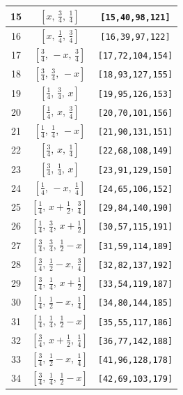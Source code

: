 \documentclass[fleqn,8pt]{jsarticle}
\begin{document}
\begin{longtable}{ccc}
15 & $\left[ x,\, \frac{3}{4},\, \frac{1}{4} \right]$ & {\tt [15,40,98,121]} \\ \hline
16 & $\left[ x,\, \frac{1}{4},\, \frac{3}{4} \right]$ & {\tt [16,39,97,122]} \\ \hline
17 & $\left[ \frac{3}{4},\, - x,\, \frac{3}{4} \right]$ & {\tt [17,72,104,154]} \\ \hline
18 & $\left[ \frac{3}{4},\, \frac{3}{4},\, - x \right]$ & {\tt [18,93,127,155]} \\ \hline
19 & $\left[ \frac{1}{4},\, \frac{3}{4},\, x \right]$ & {\tt [19,95,126,153]} \\ \hline
20 & $\left[ \frac{1}{4},\, x,\, \frac{3}{4} \right]$ & {\tt [20,70,101,156]} \\ \hline
21 & $\left[ \frac{1}{4},\, \frac{1}{4},\, - x \right]$ & {\tt [21,90,131,151]} \\ \hline
22 & $\left[ \frac{3}{4},\, x,\, \frac{1}{4} \right]$ & {\tt [22,68,108,149]} \\ \hline
23 & $\left[ \frac{3}{4},\, \frac{1}{4},\, x \right]$ & {\tt [23,91,129,150]} \\ \hline
24 & $\left[ \frac{1}{4},\, - x,\, \frac{1}{4} \right]$ & {\tt [24,65,106,152]} \\ \hline
25 & $\left[ \frac{1}{4},\, x + \frac{1}{2},\, \frac{3}{4} \right]$ & {\tt [29,84,140,190]} \\ \hline
26 & $\left[ \frac{1}{4},\, \frac{3}{4},\, x + \frac{1}{2} \right]$ & {\tt [30,57,115,191]} \\ \hline
27 & $\left[ \frac{3}{4},\, \frac{3}{4},\, \frac{1}{2} - x \right]$ & {\tt [31,59,114,189]} \\ \hline
28 & $\left[ \frac{3}{4},\, \frac{1}{2} - x,\, \frac{3}{4} \right]$ & {\tt [32,82,137,192]} \\ \hline
29 & $\left[ \frac{3}{4},\, \frac{1}{4},\, x + \frac{1}{2} \right]$ & {\tt [33,54,119,187]} \\ \hline
30 & $\left[ \frac{1}{4},\, \frac{1}{2} - x,\, \frac{1}{4} \right]$ & {\tt [34,80,144,185]} \\ \hline
31 & $\left[ \frac{1}{4},\, \frac{1}{4},\, \frac{1}{2} - x \right]$ & {\tt [35,55,117,186]} \\ \hline
32 & $\left[ \frac{3}{4},\, x + \frac{1}{2},\, \frac{1}{4} \right]$ & {\tt [36,77,142,188]} \\ \hline
33 & $\left[ \frac{3}{4},\, \frac{1}{2} - x,\, \frac{1}{4} \right]$ & {\tt [41,96,128,178]} \\ \hline
34 & $\left[ \frac{3}{4},\, \frac{1}{4},\, \frac{1}{2} - x \right]$ & {\tt [42,69,103,179]} \\ \hline

\end{longtable}
\end{document}
